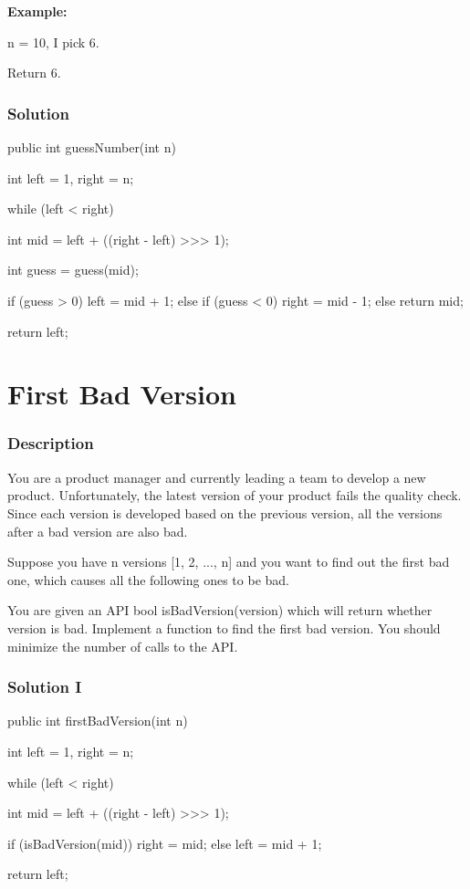 \textbf{Example:}

n = 10, I pick 6.

Return 6.

\subsubsection{Solution}

\begin{Code}
public int guessNumber(int n) {
    int left = 1, right = n;

    while (left < right) {
        int mid = left + ((right - left) >>> 1);

        int guess = guess(mid);

        if (guess > 0) {
            left = mid + 1;
        } else if (guess < 0) {
            right = mid - 1;
        } else {
            return mid;
        }
    }

    return left;
}
\end{Code}

\newpage

\section{First Bad Version} %

\subsubsection{Description}
You are a product manager and currently leading a team to develop a new product. Unfortunately, the latest version of your product fails the quality check. Since each version is developed based on the previous version, all the versions after a bad version are also bad.

Suppose you have n versions [1, 2, ..., n] and you want to find out the first bad one, which causes all the following ones to be bad.

You are given an API bool isBadVersion(version) which will return whether version is bad. Implement a function to find the first bad version. You should minimize the number of calls to the API.

\subsubsection{Solution I}

\begin{Code}
public int firstBadVersion(int n) {
    int left = 1, right = n;

    while (left < right) {
        int mid = left + ((right - left) >>> 1);

        if (isBadVersion(mid)) {
            right = mid;
        } else {
            left = mid + 1;
        }
    }

    return left;
}
\end{Code}

